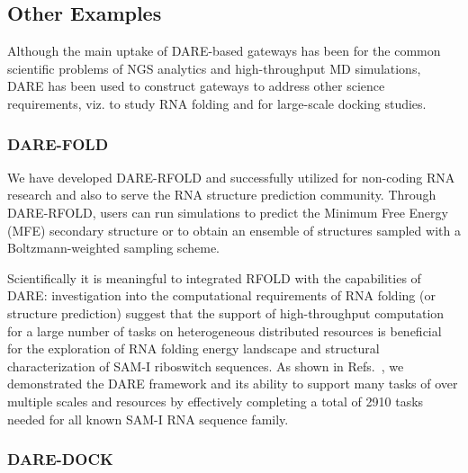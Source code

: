\documentclass[]{svjour3}
\begin{document}
\subsection{Other Examples}

Although the main uptake of DARE-based gateways has been for the
common scientific problems of NGS analytics and high-throughput MD
simulations, DARE has been used to construct gateways to address other
science requirements, viz. to study RNA folding and for large-scale
docking studies.

\subsubsection{DARE-FOLD}


We have developed DARE-RFOLD and successfully utilized for non-coding
RNA research and also to serve the RNA structure prediction
community. Through DARE-RFOLD, users can run simulations to predict
the Minimum Free Energy (MFE) secondary structure or to obtain an
ensemble of structures sampled with a Boltzmann-weighted sampling
scheme.


Scientifically it is meaningful to integrated RFOLD with the
capabilities of DARE: investigation into the computational
requirements of RNA folding (or structure prediction) suggest that the
support of high-throughput computation for a large number of tasks on
heterogeneous distributed resources is beneficial for the exploration
of RNA folding energy landscape and structural characterization of
SAM-I riboswitch sequences. As shown in
Refs.~\cite{dare-ecmls11,ccpe11}, we demonstrated the DARE framework
and its ability to support many tasks of over multiple scales and
resources by effectively completing a total of 2910 tasks needed for
all known SAM-I RNA sequence family.

\subsubsection{DARE-DOCK}
\end{document}
